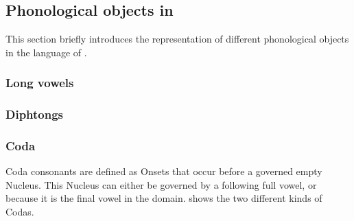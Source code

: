 \subsection{Phonological objects in \CVCV}
\label{subsec:intro:obj}

This section briefly introduces the representation
of different phonological objects in the language of
\CVCV.



\subsubsection{Long vowels}
\begin{structure}{}
\end{structure}


\subsubsection{Diphtongs}


\subsubsection{Coda}\label{intro:obj:coda}
Coda consonants are defined as Onsets that occur before
a governed empty Nucleus.\parencite[p.~192]{scheer2004}
This Nucleus can either be governed by a following full
vowel,  or because it is the final
vowel in the domain.
 shows the two different kinds
of Codas.

